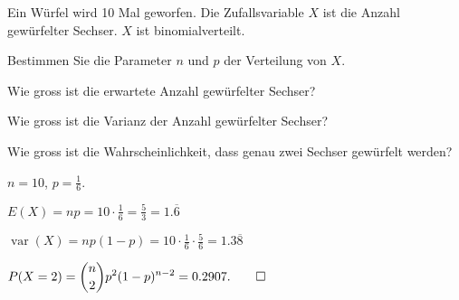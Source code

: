Ein Würfel wird 10 Mal geworfen. 
Die Zufallsvariable $X$ ist die Anzahl gewürfelter Sechser.
$X$ ist binomialverteilt.
\begin{teilaufgaben}
\item 
Bestimmen Sie die Parameter $n$ und $p$ der Verteilung von $X$.
\item
Wie gross ist die erwartete Anzahl gewürfelter Sechser?
\item
Wie gross ist die Varianz der Anzahl gewürfelter Sechser?
\item
Wie gross ist die Wahrscheinlichkeit, dass genau zwei Sechser
gewürfelt werden?
\end{teilaufgaben}


\begin{loesung}
\begin{teilaufgaben}
\item $n=10$, $p=\frac16$.
\item $E(X)=np = 10\cdot\frac16=\frac53=1.\overline{6}$
\item $\operatorname{var}(X) = np(1-p) = 10\cdot\frac16\cdot\frac56
=1.3\overline{8}$
\item 
\(
\displaystyle
P(X=2)
=
\binom{n}{2} p^2 (1-p)^{n-2}
=
0.2907.
\qedhere
\)
\end{teilaufgaben}
\end{loesung}



